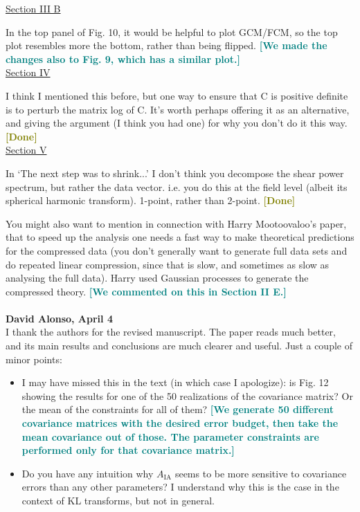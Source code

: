 \documentclass{article}
\newcommand\reply[1]{{\bf {\textcolor{teal}{[#1]}}}}
\newcommand\done{{\bf {\textcolor{olive}{[Done]}}}}
\begin{document}
    \underline{Section III B}
    
    In the top panel of Fig. 10, it would be helpful to plot GCM/FCM, so the top plot resembles more the bottom, rather than being flipped. \reply{We made the changes also to Fig. 9, which has a similar plot.}\\
    
    \underline{Section IV}
    
    I think I mentioned this before, but one way to ensure that C is positive definite is to perturb the matrix log of C.  It’s worth perhaps offering it as an alternative, and giving the argument (I think you had one) for why you don’t do it this way. \done \\
    
    \underline{Section V}
    
    In ‘The next step was to shrink...’ I don’t think you decompose the shear power spectrum, but rather the data vector.  i.e. you do this at the field level (albeit its spherical harmonic transform).  1-point, rather than 2-point. \done

    You might also want to mention in connection with Harry Mootoovaloo’s paper, that to speed up the analysis one needs a fast way to make theoretical predictions for the compressed data (you don’t generally want to generate full data sets and do repeated linear compression, since that is slow, and sometimes as slow as analysing the full data).  Harry used Gaussian processes to generate the compressed theory. \reply{We commented on this in Section II E.} \\  \\
	
	
	\textbf{David Alonso, April 4} \\

    I thank the authors for the revised manuscript. The paper reads much better, and its main results and conclusions are much clearer and useful. Just a couple of minor points:
    \begin{itemize}
        \item I may have missed this in the text (in which case I apologize): is Fig. 12 showing the results for one of the 50 realizations of the covariance matrix? Or the mean of the constraints for all of them? \reply{We generate 50 different covariance matrices with the desired error budget, then take the mean covariance out of those. The parameter constraints are performed only for that covariance matrix.}
        \item Do you have any intuition why $A_{\mathrm{IA}}$ seems to be more sensitive to covariance errors than any other parameters? I understand why this is the case in the context of KL transforms, but not in general. \\  \\
    \end{itemize}
	
\end{document}

